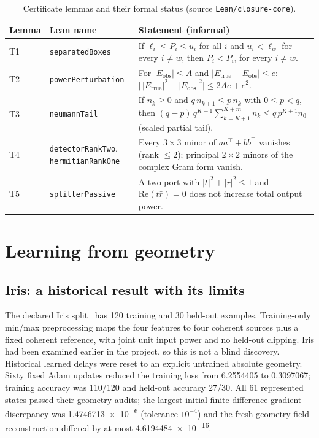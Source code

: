 \documentclass[11pt,a4paper]{article}
\begin{document}
\begin{table}[t]
\centering
\caption{Certificate lemmas and their formal status (source \texttt{Lean/closure-core}).}
\label{tab:lean}
\small
\begin{tabularx}{\textwidth}{@{}l>{\raggedright\arraybackslash}p{3.3cm}>{\raggedright\arraybackslash}X@{}}
\toprule
Lemma & Lean name & Statement (informal) \\
\midrule
T1 & \texttt{separatedBoxes} & If $\ell_i \le P_i \le u_i$ for all $i$ and $u_i < \ell_w$ for every $i \ne w$, then $P_i < P_w$ for every $i \ne w$. \\
T2 & \texttt{powerPerturbation} & For $|E_{\mathrm{obs}}| \le A$ and $|E_{\mathrm{true}} - E_{\mathrm{obs}}| \le e$: $\big|\,|E_{\mathrm{true}}|^2 - |E_{\mathrm{obs}}|^2\big| \le 2Ae + e^2$. \\
T3 & \texttt{neumannTail} & If $n_k \ge 0$ and $q\,n_{k+1} \le p\,n_k$ with $0 \le p < q$, then $(q-p)\,q^{K+1}\sum_{k=K+1}^{K+m} n_k \le q\,p^{K+1} n_0$ (scaled partial tail). \\
T4 & \texttt{detectorRankTwo}, \texttt{hermitianRankOne} & Every $3\times3$ minor of $aa^{\top}+bb^{\top}$ vanishes (rank $\le 2$); principal $2\times2$ minors of the complex Gram form vanish. \\
T5 & \texttt{splitterPassive} & A two-port with $|t|^2+|r|^2 \le 1$ and $\mathrm{Re}(t\bar r)=0$ does not increase total output power. \\
\bottomrule
\end{tabularx}
\end{table}

\section{Learning from geometry}
\label{sec:learn}

\subsection{Iris: a historical result with its limits}
The declared Iris split~\cite{fisher1936,uciiris} has 120 training and 30 held-out examples. Training-only min/max preprocessing maps the four features to four coherent sources plus a fixed coherent reference, with joint unit input power and no held-out clipping. Iris had been examined earlier in the project, so this is not a blind discovery. Historical learned delays were reset to an explicit untrained absolute geometry. Sixty fixed Adam updates reduced the training loss from \num{6.2554405} to \num{0.3097067}; training accuracy was 110/120 and held-out accuracy 27/30. All 61 represented states passed their geometry audits; the largest initial finite-difference gradient discrepancy was \num{1.4746713e-6} (tolerance $10^{-4}$) and the fresh-geometry field reconstruction differed by at most \num{4.6194484e-16}.
\end{document}
